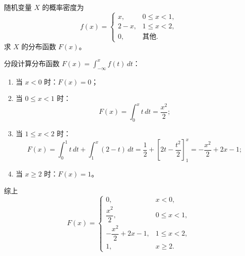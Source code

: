 ﻿\documentclass[lang=cn,11pt]{elegantbook}
\begin{document}
\begin{exercise}[分段概率密度的分布函数] \label{exer:2-47}
随机变量 $X$ 的概率密度为
\[
f(x)=
\begin{cases}
x, & 0\leqslant x<1, \\[6pt]
2-x, & 1\leqslant x<2, \\[6pt]
0, & \text{其他}.
\end{cases}
\]
求 $X$ 的分布函数 $F(x)$。
\end{exercise}
\begin{solution}
分段计算分布函数 $F(x) = \int_{-\infty}^{x} f(t)\,dt$：
\begin{enumerate}
    \item 当 $x<0$ 时：$F(x)=0$；
    \item 当 $0\leqslant x<1$ 时：
    \[
    F(x) = \int_0^x t\,dt = \frac{x^2}{2};
    \]
    \item 当 $1\leqslant x<2$ 时：
    \[
    F(x) = \int_0^1 t\,dt + \int_1^x (2-t)\,dt = \frac{1}{2} + \left[2t - \frac{t^2}{2}\right]_1^x = -\frac{x^2}{2} + 2x - 1;
    \]    
    \item 当 $x\geqslant2$ 时：$F(x)=1$。
\end{enumerate}
综上
\[
F(x)=
\begin{cases}
0, & x<0, \\[6pt]
\dfrac{x^2}{2}, & 0\leqslant x<1, \\[6pt]
-\dfrac{x^2}{2}+2x-1, & 1\leqslant x<2, \\[6pt]
1, & x\geqslant2.
\end{cases}
\]
\end{solution}
\end{document}
